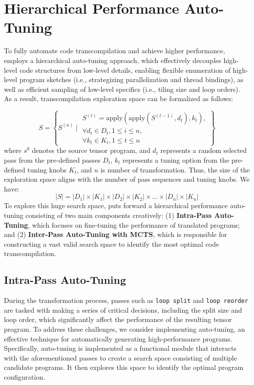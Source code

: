 \section{Hierarchical Performance Auto-Tuning}
\label{sec:auto-tuning}
To fully automate code transcompilation and achieve higher performance, \name{} employs a hierarchical auto-tuning approach, which effectively decouples high-level code structures from low-level details, enabling flexible enumeration of high-level program sketches (i.e., strategizing parallelization and thread bindings), as well as efficient sampling of low-level specifics (i.e., tiling size and loop orders). As a result, transcompilation exploration space can be formalized as follows:

\vspace{-5pt}
\small\begin{equation}
S = \left\{ S^{(n)} \mid 
\begin{array}{l}
S^{(t)} = \text{apply}(\text{apply}(S^{(t-1)}, d_t), k_t), \\
\forall d_t \in D_t, 1 \leq i \leq n, \\
\forall k_t \in K_t, 1 \leq t \leq n
\end{array}
\right\}
\label{eq:searchspace}
\end{equation}
\normalsize
where $s^{0}$ denotes the source tensor program, and $d_{t}$ represents a random selected pass from the pre-defined passes $D_{t}$, $k_{t}$ represents a tuning option from the pre-defined tuning knobs $K_{t}$, and $n$ is number of transformation. Thus, the size of the exploration space aligns with the number of
pass sequences and tuning knobs. We have:
\small\begin{equation}
|S| = |D_{1}| \times |K_{1}| \times |D_{2}| \times |K_{2}| \times \ldots \times |D_{n}| \times |K_n|
\end{equation}
\normalsize
To explore this huge search space, \name{} puts forward a hierarchical performance auto-tuning consisting of two main components creatively: (1) \textbf{Intra-Pass Auto-Tuning}, which focuses on fine-tuning the performance of translated programs; and (2) \textbf{Inter-Pass Auto-Tuning with MCTS}, which is responsible for constructing a vast valid search space to identify the most optimal code transcompilation.



\subsection{Intra-Pass Auto-Tuning}%
During the transformation process, passes such as \texttt{loop split} and \texttt{loop reorder} are tasked with making a series of critical decisions, including the split size and loop order, which significantly affect the performance of the resulting tensor program. To address these challenges, we consider implementing auto-tuning, an effective technique for automatically generating high-performance programs. Specifically, auto-tuning is implemented as a functional module that interacts with the aforementioned passes to create a search space consisting of multiple candidate programs. It then explores this space to identify the optimal program configuration.

